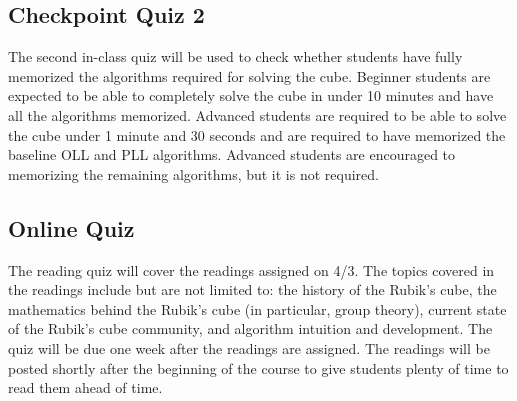 \documentclass[11pt]{article}
\begin{document}
\subsection*{Checkpoint Quiz 2}
The second in-class quiz will be used to check whether students have fully memorized the algorithms required for solving the cube. Beginner students are expected to be able to completely solve the cube in under 10 minutes and have all the algorithms memorized. Advanced students are required to be able to solve the cube under 1 minute and 30 seconds and are required to have memorized the baseline OLL and PLL algorithms. Advanced students are encouraged to memorizing the remaining algorithms, but it is not required.


\subsection*{Online Quiz}
The reading quiz will cover the readings assigned on 4/3. The topics covered in the readings include but are not limited to: the history of the Rubik’s cube, the mathematics behind the Rubik’s cube (in particular, group theory), current state of the Rubik’s cube community, and algorithm intuition and development. The quiz will be due one week after the readings are assigned. The readings will be posted shortly after the beginning of the course to give students plenty of time to read them ahead of time.
\end{document}
